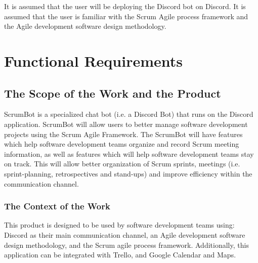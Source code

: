 \documentclass[12pt, titlepage]{article}
\begin{document}
It is assumed that the user will be deploying the Discord bot on Discord. It is assumed that the user is familiar with the Scrum Agile process framework and the Agile development software design methodology.

\section{Functional Requirements}

\subsection{The Scope of the Work and the Product}
ScrumBot is a specialized chat bot (i.e. a Discord Bot) that runs on the Discord application. ScrumBot will allow users to better manage software development projects using the Scrum Agile Framework. The ScrumBot will have features which help software development teams organize and record Scrum meeting information, as well as features which will help software development teams stay on track. This will allow better organization of Scrum sprints, meetings  (i.e. sprint-planning, retrospectives  and  stand-ups) and  improve  efficiency  within  the communication channel.

\subsubsection{The Context of the Work}
This product is designed to be used by software development teams using: Discord as their main communication channel, an Agile development software design methodology, and the Scrum agile process framework. Additionally, this application can be integrated with Trello, and Google Calendar and Maps.
\end{document}
